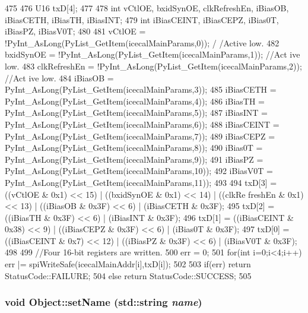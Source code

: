 \begin{DoxyCode}
475 {                            
476     U16 txD[4];
477 
478     int vCtlOE, bxidSynOE, clkRefreshEn, iBiasOB, iBiasCETH, iBiasTH, iBiasINT;
479     int iBiasCEINT, iBiasCEPZ, iBias0T, iBiasPZ, iBiasV0T;
480     
481     vCtlOE              = !PyInt_AsLong(PyList_GetItem(icecalMainParams,0));    /
      /Active low.
482     bxidSynOE       = !PyInt_AsLong(PyList_GetItem(icecalMainParams,1));    //Act
      ive low.
483     clkRefreshEn    = !PyInt_AsLong(PyList_GetItem(icecalMainParams,2));    //Act
      ive low.
484     iBiasOB         = PyInt_AsLong(PyList_GetItem(icecalMainParams,3));
485     iBiasCETH           = PyInt_AsLong(PyList_GetItem(icecalMainParams,4));
486     iBiasTH             = PyInt_AsLong(PyList_GetItem(icecalMainParams,5));
487     iBiasINT            = PyInt_AsLong(PyList_GetItem(icecalMainParams,6));
488     iBiasCEINT      = PyInt_AsLong(PyList_GetItem(icecalMainParams,7));
489     iBiasCEPZ       = PyInt_AsLong(PyList_GetItem(icecalMainParams,8));
490     iBias0T             = PyInt_AsLong(PyList_GetItem(icecalMainParams,9));
491     iBiasPZ             = PyInt_AsLong(PyList_GetItem(icecalMainParams,10));
492     iBiasV0T        = PyInt_AsLong(PyList_GetItem(icecalMainParams,11));
493 
494     txD[3] = ((vCtlOE & 0x1) << 15)         | ((bxidSynOE & 0x1) << 14) | ((clkRe
      freshEn & 0x1) << 13) | ((iBiasOB & 0x3F) << 6) | (iBiasCETH & 0x3F);
495     txD[2] = ((iBiasTH & 0x3F) << 6)        |  (iBiasINT  & 0x3F); 
496     txD[1] = ((iBiasCEINT & 0x38) << 9) | ((iBiasCEPZ & 0x3F) << 6) |  (iBias0T  
          & 0x3F);
497     txD[0] = ((iBiasCEINT & 0x7) << 12) | ((iBiasPZ   & 0x3F) << 6) |  (iBiasV0T 
          & 0x3F);
498 
499     //Four 16-bit registers are written.
500     err = 0;
501     for(int i=0;i<4;i++) err |= spiWriteSafe(icecalMainAddr[i],txD[i]);
502 
503     if(err) return StatusCode::FAILURE;
504     else        return StatusCode::SUCCESS;
505 }
\end{DoxyCode}
\hypertarget{classObject_ae30fea75683c2d149b6b6d17c09ecd0c}{
\subsubsection[{setName}]{\setlength{\rightskip}{0pt plus 5cm}void Object::setName (std::string {\em name})}}
\label{classObject_ae30fea75683c2d149b6b6d17c09ecd0c}


